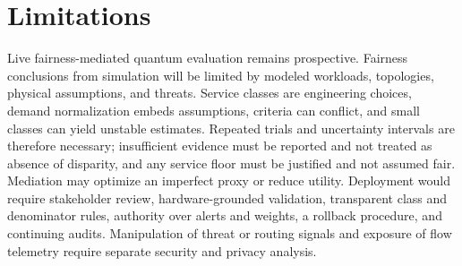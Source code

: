 \documentclass[10pt,conference]{IEEEtran}
\begin{document}
\section*{Limitations}

Live fairness-mediated quantum evaluation remains prospective. Fairness
conclusions from simulation will be limited by modeled workloads, topologies,
physical assumptions, and threats. Service classes are engineering choices, demand
normalization embeds assumptions, criteria can conflict, and small classes can
yield unstable estimates. Repeated trials and uncertainty intervals are
therefore necessary; insufficient evidence must be reported and not treated
as absence of disparity, and any service floor must be justified and not assumed fair. Mediation may optimize an imperfect proxy or reduce utility.
Deployment would require stakeholder review, hardware-grounded validation,
transparent class and denominator rules, authority over alerts and weights, a
rollback procedure, and continuing audits. Manipulation of threat or routing
signals and exposure of flow telemetry require separate security and privacy
analysis.



\end{document}
